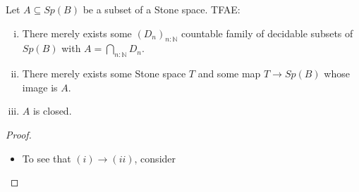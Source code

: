 %
%

\begin{theorem}
  Let $A\subseteq Sp(B)$ be a subset of a Stone space. TFAE:
  \begin{enumerate}[(i)]
    \item There merely exists some $(D_n)_{n:\mathbb N}$ countable family 
      of decidable subsets of $Sp(B)$ with $A = \bigcap_{n:\mathbb N} D_n$. 
    \item There merely exists some Stone space $T$ and some map $T\to Sp(B)$ 
      whose image is $A$. 
    \item $A$ is closed. 
  \end{enumerate}
\end{theorem}
\begin{proof}
  \begin{itemize}
    \item To see that $(i) \to (ii)$, consider 
  \end{itemize}
\end{proof} 




